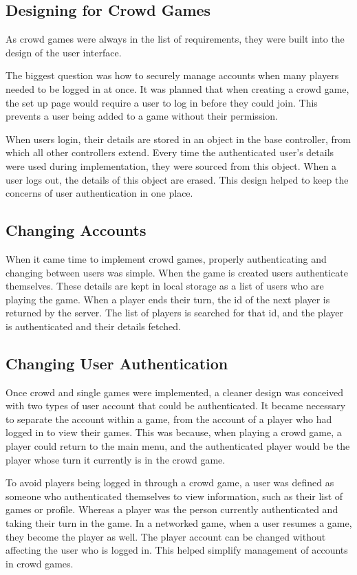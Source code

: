 \subsection{Designing for Crowd Games}
As crowd games were always in the list of requirements, they were built into the design of the user interface. 

The biggest question was how to securely manage accounts when many players needed to be logged in at once. It was planned that when creating a crowd game, the set up page would require a user to log in before they could join. This prevents a user being added to a game without their permission.

When users login, their details are stored in an object in the base controller, from which all other controllers extend. Every time the authenticated user's details were used during implementation, they were sourced from this object. When a user logs out, the details of this object are erased. This design helped to keep the concerns of user authentication in one place.

\subsection{Changing Accounts}
When it came time to implement crowd games, properly authenticating and changing between users was simple. When the game is created users authenticate themselves. These details are kept in local storage as a list of users who are playing the game. When a player ends their turn, the id of the next player is returned by the server. The list of players is searched for that id, and the player is authenticated and their details fetched.
	
\subsection{Changing User Authentication}
Once crowd and single games were implemented, a cleaner design was conceived with two types of user account that could be authenticated. It became necessary to separate the account within a game, from the account of a player who had logged in to view their games. This was because, when playing a crowd game, a player could return to the main menu, and the authenticated player would be the player whose turn it currently is in the crowd game.

To avoid players being logged in through a crowd game, a user was defined as someone who authenticated themselves to view information, such as their list of games or profile. Whereas a player was the person currently authenticated and taking their turn in the game. In a networked game, when a user resumes a game, they become the player as well. The player account can be changed without affecting the user who is logged in. This helped simplify management of accounts in crowd games.

